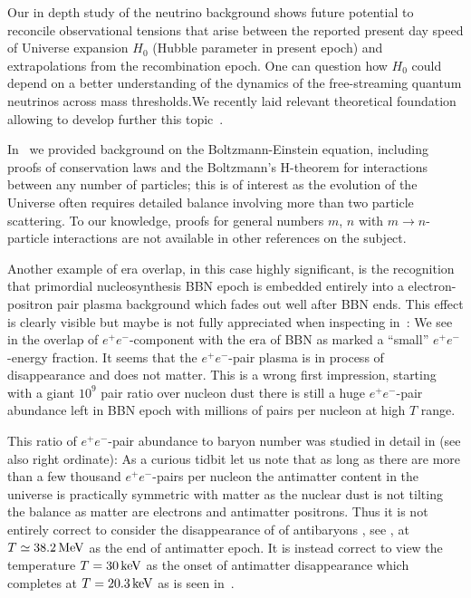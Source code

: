 Our in depth study of the neutrino background shows future potential to reconcile observational tensions that arise  between the reported present day speed of Universe expansion $H_0$ (Hubble parameter in present epoch) and extrapolations from the recombination epoch. One can question how $H_0$ could depend on a better understanding of the dynamics of the free-streaming quantum neutrinos across mass thresholds.We recently laid relevant theoretical foundation allowing to develop further this topic~\cite{Birrell:2024bdb}.

In~ we provided background on the Boltzmann-Einstein equation, including proofs of conservation laws and the Boltzmann's H-theorem for interactions between any number of particles; this is of interest as the evolution of the Universe often requires detailed balance involving more than two particle scattering. To our knowledge, proofs for general numbers $m$, $n$ with $m\to n$-particle interactions are not available in other references on the subject.

Another example of era overlap, in this case highly significant, is the recognition that primordial nucleosynthesis BBN epoch is embedded entirely into a electron-positron pair plasma background which fades out well after BBN ends. This effect is clearly visible but maybe is not fully appreciated when inspecting in~: We see in the overlap of $e^+e^-$-component with the era of BBN as marked a ``small'' $e^+e^-$-energy fraction. It seems that the $e^+e^-$-pair plasma is in process of disappearance and does not matter. This is a wrong first impression,  starting with a giant $10^9$ pair ratio over nucleon dust there is still a huge $e^+e^-$-pair abundance left in BBN epoch with millions of pairs per nucleon at high $T$ range.

This ratio of $e^+e^-$-pair abundance to baryon number was studied  in detail in  (see also   right ordinate):  As a curious tidbit let us note that as long as there are more than a few thousand $e^+e^-$-pairs per nucleon the antimatter content in the universe is practically symmetric with matter as the nuclear dust is not tilting the balance as matter are electrons and antimatter positrons. Thus it is not entirely correct to consider the disappearance of of antibaryons , see , at $T\simeq 38.2\text{\,MeV}$ as the end of antimatter epoch. It is instead correct to view the temperature $T=30\text{\,keV}$ as the onset of antimatter disappearance which completes at $T=20.3\text{\,keV}$ as is seen in~.

